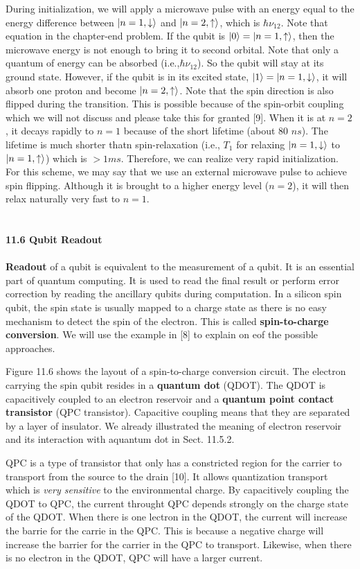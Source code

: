 \documentclass{article}
\begin{document}
During initialization, we will apply a microwave pulse with an energy equal to
the energy difference between $\ket{n=1,\downarrow}$ and $\ket{n=2,\uparrow}$, which is $\hbar \nu_{12}$.
Note that equation in the chapter-end problem. If the qubit is $\ket{0}
=\ket{n=1,\uparrow}$, then the microwave energy is not enough to bring it to 
second orbital. Note that only a quantum of energy can be absorbed (i.e.,$\hbar \nu_{12}$).
So the qubit will stay at its ground state. However, if the qubit is in its excited state, $\ket{1}=\ket{n=1,\downarrow}$,
it will absorb one proton and become $\ket{n=2,\uparrow}$. Note that the spin direction is also flipped 
during the transition. This is possible because of the spin-orbit coupling which we will not
discuss and please take this for granted [9]. When it is at $n=2$, it decays rapidly to $n=1$ because of the
short lifetime (about 80 $ns$). The lifetime is much shorter thatn spin-relaxation (i.e., $T_1$ for relaxing
$\ket{n=1,\downarrow}$ to $\ket{n=1,\uparrow}$) which is $>1 ms$. Therefore, we can realize very rapid initialization.
For this scheme, we may say that we use an external microwave pulse to achieve spin flipping. Although
it is brought to a higher energy level ($n=2$), it will then relax naturally very fast to $n=1$.\\\\\\
\textbf{\large 11.6 Qubit Readout}\\\\
\textbf{Readout} of a qubit is equivalent to the measurement of a qubit. It is an essential part of
quantum computing. It is used to read the final result or perform error correction by reading the ancillary qubits
during computation. In a silicon spin qubit, the spin state is usually mapped to a charge state as there is no easy
mechanism to detect the spin of the electron. This is called \textbf{spin-to-charge conversion}. We will use the
example in [8] to explain on eof the possible approaches.

Figure 11.6 shows the layout of a spin-to-charge conversion circuit. The electron carrying the spin qubit resides in a
\textbf{quantum dot} (QDOT). The QDOT is capacitively coupled to an electron reservoir and a \textbf{quantum point contact transistor}
(QPC transistor). Capacitive coupling means that they are separated by a layer of insulator. We already illustrated the meaning of electron
reservoir and its interaction with aquantum dot in Sect. 11.5.2.

QPC is a type of transistor that only has a constricted region for the carrier to
transport from the source to the drain [10]. It allows quantization transport which is 
\textit{very sensitive} to the environmental charge. By capacitively coupling the QDOT to QPC,
the current throught QPC depends strongly on the charge state of the QDOT.
When there is one lectron in the QDOT, the current will increase the barrie for the carrie in the 
QPC. This is because a negative charge will increase the barrier for the carrier
in the QPC to transport. Likewise, when there is no electron in the QDOT, QPC will have a larger current.
\end{document}
